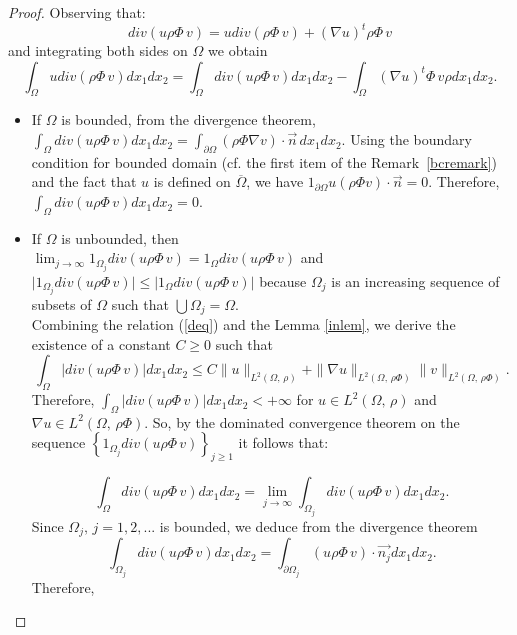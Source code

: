 \documentclass[10pt,a4paper]{amsart}
\begin{document}
{	\begin{proof}
		Observing that: \begin{equation}\label{deq}
			div(u\rho\Phi\,v)=udiv(\rho\Phi\,v)+\left(\nabla u\right)^t\rho\Phi\,v
		\end{equation} and integrating both sides on $\Omega$ we obtain 
		\begin{equation}\label{ideq}
			\int_{\Omega}udiv(\rho\Phi\,v)dx_1dx_2=\int_{\Omega}div(u\rho\Phi\,v)dx_1dx_2-\int_{\Omega}\left(\nabla u\right)^t\Phi\,v\rho dx_1dx_2.
		\end{equation}
		\begin{itemize}
		\item 	If $\Omega$ is bounded, from the divergence theorem, $\int_{\Omega}div(u\rho\Phi\,v)dx_1dx_2= {\int_{\partial\Omega}\left(\rho\Phi\nabla v\right)\cdot\overrightarrow{n}\,dx_1dx_2 }$. Using the boundary condition for bounded domain (cf. the first item of the Remark\, \ref{bcremark})  and the fact that  $u$ is defined on $\overline{\Omega}$, we have $1_{\partial\Omega}u\left(\rho\Phi v\right)\cdot\overrightarrow{n}=0$. Therefore, $\int_{\Omega}div(u\rho\Phi\,v)dx_1dx_2=0$.
		
		\item {	If $\Omega$ is unbounded, then \\$\displaystyle{\lim_{j \to \infty }1_{\Omega_j}div(u\rho\Phi\,v)}=1_{\Omega}div(u\rho\Phi\,v)$ and $\lvert1_{\Omega_j}div(u\rho\Phi\,v)\rvert\leq \lvert 1_{\Omega}div(u\rho\Phi\,v)\rvert$ because $\Omega_j$ is an {increasing} sequence of subsets of $\Omega$ such that $\bigcup\Omega_j=\Omega$.\\
		Combining the relation (\ref{deq}) and the Lemma \ref{inlem}, we derive the existence of a constant $C\geq 0$ such that
			$$\int_{\Omega}\lvert div(u\rho\Phi\,v)\rvert dx_1dx_2 \leq C \| u\|_{L^2(\Omega,\,\rho)}+\| \nabla u\|_{L^2(\Omega,\,\rho\Phi)}\| v\|_{L^2(\Omega,\,\rho\Phi)}.$$ Therefore, $\int_{\Omega}\lvert div(u\rho\Phi\,v)\rvert dx_1dx_2<+\infty$ for $u\in L^2(\Omega,\,\rho)$ and $\nabla u\in L^2(\Omega,\,\rho\Phi)$. So, by the dominated convergence theorem on the sequence $\left\{1_{\Omega_j}div(u\rho\Phi\,v)\right\}_{j\geq 1}$ it follows that:} 
		
		$$\int_{\Omega}div(u\rho\Phi\,v)dx_1dx_2=\lim_{j \to \infty }\int_{\Omega_j}div(u\rho\Phi\,v)dx_1dx_2.$$ Since  $\Omega_j,\,j=1,2,.. .$ is bounded, we deduce from the divergence theorem $$\int_{\Omega_j}div(u\rho\Phi\,v)dx_1dx_2=\int_{\partial\Omega_j}\left(u\rho\Phi\,v\right)\cdot\overrightarrow{n_j}dx_1dx_2.$$ Therefore, 
		

\end{itemize}
\end{proof}}
\end{document}
